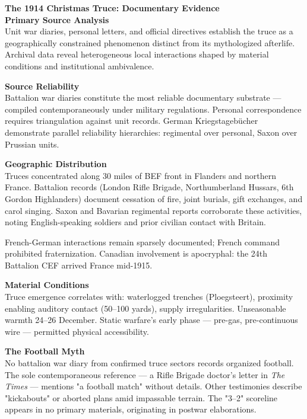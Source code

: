 \begin{technical}
{\Large\textbf{The 1914 Christmas Truce: Documentary Evidence}}\\[0.7em]

\noindent\textbf{Primary Source Analysis}\\[0.5em]
Unit war diaries, personal letters, and official directives establish the truce as a geographically constrained phenomenon distinct from its mythologized afterlife. Archival data reveal heterogeneous local interactions shaped by material conditions and institutional ambivalence.

\noindent\textbf{Source Reliability}\\[0.5em]
Battalion war diaries constitute the most reliable documentary substrate — compiled contemporaneously under military regulations. Personal correspondence requires triangulation against unit records. German Kriegstagebücher demonstrate parallel reliability hierarchies: regimental over personal, Saxon over Prussian units.

\noindent\textbf{Geographic Distribution}\\[0.5em]
Truces concentrated along 30 miles of BEF front in Flanders and northern France. Battalion records (London Rifle Brigade, Northumberland Hussars, 6th Gordon Highlanders) document cessation of fire, joint burials, gift exchanges, and carol singing. Saxon and Bavarian regimental reports corroborate these activities, noting English-speaking soldiers and prior civilian contact with Britain.

French-German interactions remain sparsely documented; French command prohibited fraternization. Canadian involvement is apocryphal: the 24th Battalion CEF arrived France mid-1915.

\noindent\textbf{Material Conditions}\\[0.5em]
Truce emergence correlates with: waterlogged trenches (Ploegsteert), proximity enabling auditory contact (50–100 yards), supply irregularities. Unseasonable warmth 24–26 December. Static warfare's early phase — pre-gas, pre-continuous wire — permitted physical accessibility.

\noindent\textbf{The Football Myth}\\[0.5em]
No battalion war diary from confirmed truce sectors records organized football. The sole contemporaneous reference — a Rifle Brigade doctor's letter in \textit{The Times} — mentions "a football match" without details. Other testimonies describe "kickabouts" or aborted plans amid impassable terrain. The "3–2" scoreline appears in no primary materials, originating in postwar elaborations. 


\end{technical}
